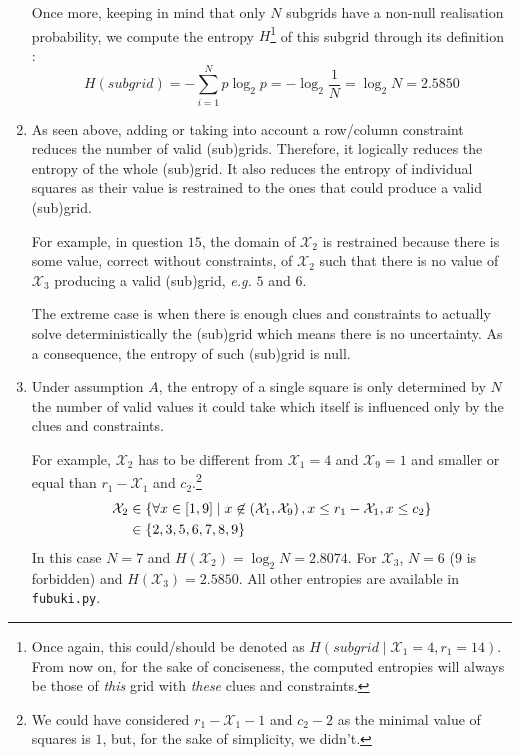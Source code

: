 \documentclass[a4paper, 12pt]{article}
\newcommand{\X}{\mathcal{X}}
\begin{document}
\begin{enumerate}[leftmargin=*]
        Once more, keeping in mind that only $N$ subgrids have a non-null realisation probability, we compute the entropy $H$\footnote{Once again, this could/should be denoted as $H(subgrid \mid \X_1 = 4, r_1 = 14)$. From now on, for the sake of conciseness, the computed entropies will always be those of \emph{this} grid with \emph{these} clues and constraints.} of this subgrid through its definition :
        \begin{equation}
            H(subgrid) = -\sum_{i=1}^{N} p \log_2 p = -\log_2 \frac{1}{N} = \log_2 N = \num{2.5850}
        \end{equation}

        \item As seen above, adding or taking into account a row/column constraint reduces the number of valid (sub)grids. Therefore, it logically reduces the entropy of the whole (sub)grid. It also reduces the entropy of individual squares as their value is restrained to the ones that could produce a valid (sub)grid.
        
        For example, in question $15$, the domain of $\X_2$ is restrained because there is some value, correct without constraints, of $\X_2$ such that there is no value of $\X_3$ producing a valid (sub)grid, \emph{e.g.} $5$ and $6$.
        
        The extreme case is when there is enough clues and constraints to actually solve deterministically the (sub)grid which means there is no uncertainty. As a consequence, the entropy of such (sub)grid is null.

        \item Under assumption $A$, the entropy of a single square is only determined by $N$ the number of valid values it could take which itself is influenced only by the clues and constraints.
        
        For example, $\X_2$ has to be different from $\X_1 = 4$ and $\X_9 = 1$ and smaller or equal than $r_1 - \X_1$ and $c_2$.\footnote{We could have considered $r_1 - \X_1 - 1$ and $c_2 - 2$ as the minimal value of squares is $1$, but, for the sake of simplicity, we didn't. }
        \begin{align*}
            \X_2 & \in \cbk{\forall x \in \sbk{1, 9} \mid x \not\in \rbk{\X_1, \X_9}, x \leq r_1 - \X_1, x \leq c_2} \\
            & \in \cbk{2, 3, 5, 6, 7, 8, 9}
        \end{align*}
        In this case $N = 7$ and $H(\X_2) = \log_2 N = \num{2.8074}$. For $\X_3$, $N = 6$ ($9$ is forbidden) and $H(\X_3) = \num{2.5850}$. All other entropies are available in \texttt{fubuki.py}.
        

\end{enumerate}
\end{document}
